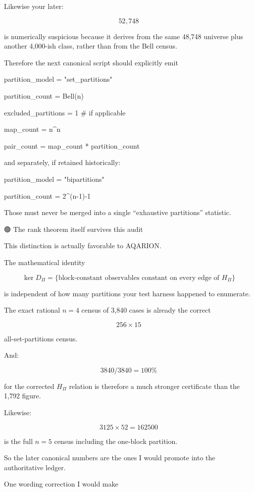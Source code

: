 Likewise your later:

\[
52,748  
\]

is numerically suspicious because it derives from the same 48,748 universe plus another 4,000-ish class, rather than from the Bell census.


Therefore the next canonical script should explicitly emit


partition_model = "set_partitions"

partition_count = Bell(n)

excluded_partitions = 1   # if applicable

map_count = n^n

pair_count = map_count * partition_count


and separately, if retained historically:


partition_model = "bipartitions"

partition_count = 2^(n-1)-1


Those must never be merged into a single “exhaustive partitions” statistic.



🟢 The rank theorem itself survives this audit


This distinction is actually favorable to AQARION.


The mathematical identity

\[
\ker D_\Pi  
=  
\{\text{block-constant observables constant on every edge of }H_\Pi\}  
\]

is independent of how many partitions your test harness happened to enumerate.


The exact rational \(n=4\) census of 3,840 cases is already the correct

\[
256\times15  
\]

all-set-partitions census.


And:

\[
3840/3840=100\%  
\]

for the corrected \(H_\Pi\) relation is therefore a much stronger certificate than the 1,792 figure.


Likewise:

\[
3125\times52=162500  
\]

is the full \(n=5\) census including the one-block partition.


So the later canonical numbers are the ones I would promote into the authoritative ledger.



One wording correction I would make



